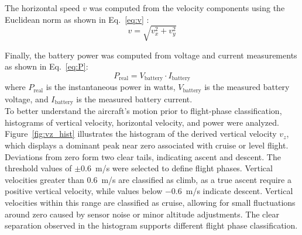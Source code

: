 The horizontal speed $v$ was computed from the velocity components using the Euclidean norm as shown in Eq.~\eqref{eq:v} :
\begin{equation}
v = \sqrt{v_x^2 + v_y^2}  
\label{eq:v}
\end{equation}

Finally, the battery power was computed from voltage and current measurements as shown in Eq.~\eqref{eq:P}:
\begin{equation}
P_{\text{real}} = V_{\text{battery}} \cdot I_{\text{battery}} 
\label{eq:P}
\end{equation}
where $ P_{\text{real}} $ is the instantaneous power in watts, $ V_{\text{battery}} $ is the measured battery voltage, and $ I_{\text{battery}} $ is the measured battery current.\\

To better understand the aircraft’s motion prior to flight-phase classification, histograms of vertical velocity, horizontal velocity, and power were analyzed. Figure~\ref{fig:vz_hist}
 illustrates the histogram of the derived vertical velocity $v_z$, which displays a dominant peak near zero associated with cruise or level flight. Deviations from zero form two clear tails, indicating ascent and descent.
The threshold values of $\pm 0.6$~m/s were selected to define flight phases. Vertical velocities greater than $0.6$~m/s are classified as climb, as a true ascent require a positive vertical velocity, while values below $-0.6$~m/s indicate descent. Vertical velocities within this range are classified as cruise, allowing for small fluctuations around zero caused by sensor noise or minor altitude adjustments. The clear separation observed in the histogram supports different  flight phase classification.

